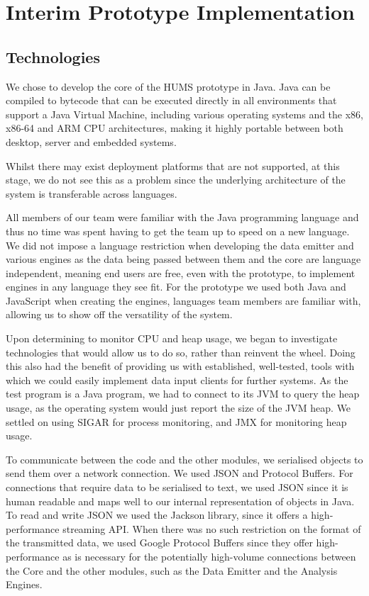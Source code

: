 \documentclass[10pt,a4paper]{article}
\begin{document}
\section{Interim Prototype Implementation}

\subsection{Technologies}

We chose to develop the core of the HUMS prototype in Java. Java can
be compiled to bytecode that can be executed directly in all
environments that support a Java Virtual Machine, including various
operating systems and the x86, x86-64 and ARM CPU architectures,
making it highly portable between both desktop, server and embedded
systems. %

Whilst there may exist deployment platforms that are not supported, at
this stage, we do not see this as a problem since the underlying
architecture of the system is transferable across languages.

All members of our team were familiar with the Java programming
language and thus no time was spent having to get the team up to speed
on a new language. We did not impose a language restriction when
developing the data emitter and various engines as the data being
passed between them and the core are language independent, meaning 
end users are free, even with the prototype, to implement engines in any
language they see fit. For the prototype we used both Java and
JavaScript when creating the engines, languages team members are
familiar with, allowing us to show off the versatility of the system.

Upon determining to monitor CPU and heap usage, we began to investigate
technologies that would allow us to do so, rather than reinvent the wheel.
Doing this also had the benefit of providing us with established, well-tested,
tools with which we could easily implement data input clients for further
systems. As the test program is a Java program, we had to connect to its JVM to query the heap usage, as the operating system would just report the size of the JVM heap. We settled on using SIGAR for process monitoring, and JMX for monitoring heap usage.

To communicate between the code and the other modules, we serialised objects to send them over a network connection. We used JSON and Protocol Buffers. For connections that require data to be serialised to text, we used JSON since it is human readable and maps well to our internal representation of objects in Java. To read and write JSON we used the Jackson library, since it offers a high-performance streaming API. When there was no such restriction on the format of the transmitted data, we used Google Protocol Buffers since they offer high-performance as is necessary for the potentially high-volume connections between the Core and the other modules, such as the Data Emitter and the Analysis Engines.
\end{document}

